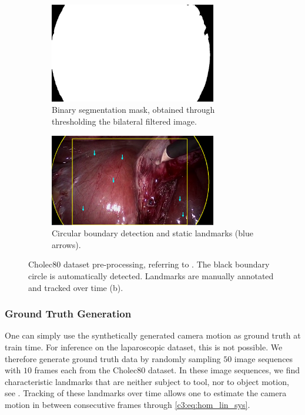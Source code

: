 \begin{figure}
\centering
\begin{subfigure}[b]{\textwidth}
    \centering
    \includegraphics[width=0.8\textwidth]{img/annotation/annotation_seg.png}
    \caption{Binary segmentation mask, obtained through thresholding the bilateral filtered image.}
    \label{c3:fig:seg_a}
\end{subfigure}
\begin{subfigure}[b]{\textwidth}
    \centering
    \includegraphics[width=0.8\textwidth]{img/annotation/annotation_real.png}
    \caption{Circular boundary detection and static landmarks (blue arrows).}
    \label{c3:fig:seg_b}
\end{subfigure}
\caption{Cholec80 dataset pre-processing, referring to . The black boundary circle is automatically detected. Landmarks are manually annotated and tracked over time (b).}
\label{c3:fig:seg}
\end{figure}

\subsubsection{Ground Truth Generation}
\label{c3:sec:gt_gen}
One can simply use the synthetically generated camera motion as ground truth at train time. For inference on the laparoscopic dataset, this is not possible. We therefore generate ground truth data by randomly sampling $50$ image sequences with $10$ frames each from the Cholec80 dataset. In these image sequences, we find characteristic landmarks that are neither subject to tool, nor to object motion, see . Tracking of these landmarks over time allows one to estimate the camera motion in between consecutive frames through \eqref{c3:eq:hom_lin_sys}.

